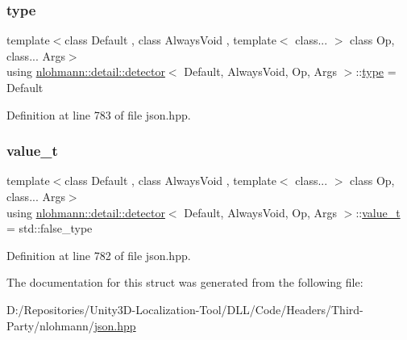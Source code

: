 \subsubsection{\texorpdfstring{type}{type}}
{\footnotesize\ttfamily template$<$class Default , class Always\+Void , template$<$ class... $>$ class Op, class... Args$>$ \\
using \mbox{\hyperlink{structnlohmann_1_1detail_1_1detector}{nlohmann\+::detail\+::detector}}$<$ Default, Always\+Void, Op, Args $>$\+::\mbox{\hyperlink{structnlohmann_1_1detail_1_1detector_a0cd69423587748bf3d3d702cc7b7c2ce}{type}} =  Default}



Definition at line 783 of file json.\+hpp.

\mbox{\label{structnlohmann_1_1detail_1_1detector_a5a132aab543d1706e2439268faf8d487}} 
\subsubsection{\texorpdfstring{value\_t}{value\_t}}
{\footnotesize\ttfamily template$<$class Default , class Always\+Void , template$<$ class... $>$ class Op, class... Args$>$ \\
using \mbox{\hyperlink{structnlohmann_1_1detail_1_1detector}{nlohmann\+::detail\+::detector}}$<$ Default, Always\+Void, Op, Args $>$\+::\mbox{\hyperlink{structnlohmann_1_1detail_1_1detector_a5a132aab543d1706e2439268faf8d487}{value\+\_\+t}} =  std\+::false\+\_\+type}



Definition at line 782 of file json.\+hpp.



The documentation for this struct was generated from the following file\+:\begin{DoxyCompactItemize}
\item 
D\+:/\+Repositories/\+Unity3\+D-\/\+Localization-\/\+Tool/\+D\+L\+L/\+Code/\+Headers/\+Third-\/\+Party/nlohmann/\mbox{\hyperlink{json_8hpp}{json.\+hpp}}\end{DoxyCompactItemize}
